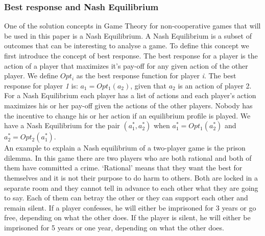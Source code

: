 \subsubsection{Best response and Nash Equilibrium}
One of the solution concepts in Game Theory for non-cooperative games that will be used in this paper is a Nash Equilibrium. A Nash Equilibrium is a subset of outcomes that can be interesting to analyse a game. To define this concept we first introduce the concept of best response. The best response for a player is the action of a player that maximizes it's pay-off for any given action of the other player. We define $Opt_{i}$ as the best response function for player \textit{i}. The best response for player \textit{1} is: $a_{1} = Opt_{1}(a_{2})$, given that $a_{2}$ is an action of player 2. For a Nash Equilibrium each player has a list of actions and each player's action maximizes his or her pay-off given the actions of the other players. Nobody has the incentive to change his or her action if an equilibrium profile is played. We have a Nash Equilibrium for the pair $(a_{1}^{*},a_{2}^{*})$ when $a_{1}^{*} = Opt_{1}(a_{2}^{*})$ and $a_{2}^{*} = Opt_{2}(a_{1}^{*})$.\\


An example to explain a Nash equilibrium of a two-player game is the prison dilemma. In this game there are two players who are both rational and both of them have committed a crime. `Rational' means that they want the best for themselves and it is not their purpose to do harm to others. Both are locked in a separate room and they cannot tell in advance to each other what they are going to say. Each of them can betray the other or they can support each other and remain silent. If a player confesses, he will either be imprisoned for 3 years or go free, depending on what the other does. If the player is silent, he will either be imprisoned for 5 years or one year, depending on what the other does.  \\ 


